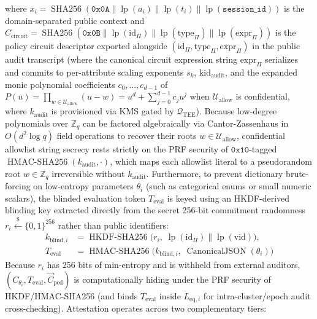 \documentclass[conference,10pt]{IEEEtran}
\begin{document}
where $x_i = \operatorname{SHA256}(\mathtt{0x0A} \parallel \operatorname{lp}(a_i) \parallel \operatorname{lp}(t_i) \parallel \operatorname{lp}(\texttt{session\_id}))$ is the domain-separated public context and $C_{\text{circuit}} = \operatorname{SHA256}(\mathtt{0x0B} \parallel \operatorname{lp}(\mathrm{id}_{\Pi}) \parallel \operatorname{lp}(\text{type}_{\Pi}) \parallel \operatorname{lp}(\text{expr}_{\Pi}))$ is the policy circuit descriptor exported alongside $(\mathrm{id}_{\Pi}, \text{type}_{\Pi}, \text{expr}_{\Pi})$ in the public audit transcript (where the canonical circuit expression string $\text{expr}_{\Pi}$ serializes and commits to per-attribute scaling exponents $s_k$, $\text{kid}_{\text{audit}}$, and the expanded monic polynomial coefficients $c_0, \dots, c_{d-1}$ of $P(u) = \prod_{w \in \mathcal{U}_{\text{allow}}}(u - w) = u^d + \sum_{j=0}^{d-1} c_j u^j$ when $\mathcal{U}_{\text{allow}}$ is confidential, where $k_{\text{audit}}$ is provisioned via KMS gated by $\mathcal{Q}_{\text{TEE}}$). Because low-degree polynomials over $\mathbb{Z}_q$ can be factored algebraically via Cantor-Zassenhaus in $O(d^2 \log q)$ field operations to recover their roots $w \in \mathcal{U}_{\text{allow}}$, confidential allowlist string secrecy rests strictly on the PRF security of $\mathtt{0x10}$-tagged $\operatorname{HMAC-SHA256}(k_{\text{audit}}, \cdot)$, which maps each allowlist literal to a pseudorandom root $w \in \mathbb{Z}_q$ irreversible without $k_{\text{audit}}$. Furthermore, to prevent dictionary brute-forcing on low-entropy parameters $\theta_i$ (such as categorical enums or small numeric scalars), the blinded evaluation token $T_{\text{eval}}$ is keyed using an HKDF-derived blinding key extracted directly from the secret 256-bit commitment randomness $r_i \xleftarrow{\$} \{0,1\}^{256}$ rather than public identifiers:
\begin{equation}
\begin{split}
k_{\text{blind}, i} &= \operatorname{HKDF-SHA256}\big(r_i, \;\operatorname{lp}(\mathrm{id}_{\Pi}) \parallel \operatorname{lp}(\text{vid})\big), \\
T_{\text{eval}} &= \operatorname{HMAC-SHA256}\big(k_{\text{blind}, i}, \;\operatorname{CanonicalJSON}(\theta_i)\big)
\end{split}
\end{equation}
Because $r_i$ has 256 bits of min-entropy and is withheld from external auditors, $(C_{\theta_i}, T_{\text{eval}}, \vec{C}_{\text{ped}})$ is computationally hiding under the PRF security of HKDF/HMAC-SHA256 (and binds $T_{\text{eval}}$ inside $L_{\text{eq}, i}$ for intra-cluster/epoch audit cross-checking). Attestation operates across two complementary tiers:
\end{document}
